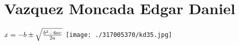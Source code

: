 \chapter{Vazquez Moncada Edgar Daniel}
$x=-b\pm\sqrt{b^2-4ac\over 2a}$
\texttt{[image: ./317005370/kd35.jpg]}


